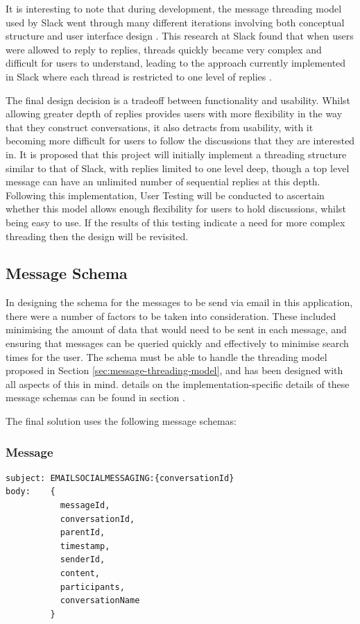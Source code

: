 It is interesting to note that during development, the message threading model used by Slack went through many different iterations involving both conceptual structure and user interface design \cite{florin2018}. This research at Slack found that when users were allowed to reply to replies, threads quickly became very complex and difficult for users to understand, leading to the approach currently implemented in Slack where each thread is restricted to one level of replies \cite{florin2018}.

The final design decision is a tradeoff between functionality and usability. Whilst allowing greater depth of replies provides users with more flexibility in the way that they construct conversations, it also detracts from usability, with it becoming more difficult for users to follow the discussions that they are interested in. It is proposed that this project will initially implement a threading structure similar to that of Slack, with replies limited to one level deep, though a top level message can have an unlimited number of sequential replies at this depth. Following this implementation, User Testing will be conducted to ascertain whether this model allows enough flexibility for users to hold discussions, whilst being easy to use. If the results of this testing indicate a need for more complex threading then the design will be revisited.

\subsection{Message Schema}
In designing the schema for the messages to be send via email in this application, there were a number of factors to be taken into consideration. These included minimising the amount of data that would need to be sent in each message, and ensuring that messages can be queried quickly and effectively to minimise search times for the user. The schema must be able to handle the threading model proposed in Section \ref{sec:message-threading-model}, and has been designed with all aspects of this in mind. details on the implementation-specific details of these message schemas can be found in section .

The final solution uses the following message schemas:

\subsubsection{Message}
\begin{verbatim}
subject: EMAILSOCIALMESSAGING:{conversationId}
body:    {
           messageId,
           conversationId,
           parentId,
           timestamp,
           senderId,
           content,
           participants,
           conversationName
         }
\end{verbatim}

